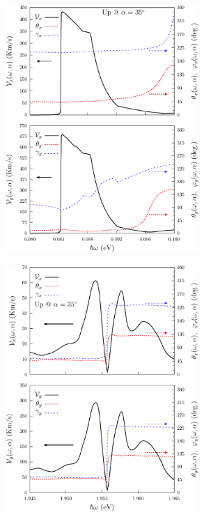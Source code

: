 \documentclass{beamer}
\begin{document}







\begin{frame}

\begin{center}
\includegraphics[width=0.55\textwidth]{figs/fig7.pdf}
\end{center}  

\end{frame}


\begin{frame}

\begin{center}
\includegraphics[width=0.55\textwidth]{figs/fig8.pdf}
\end{center}  

\end{frame}
\end{document}
